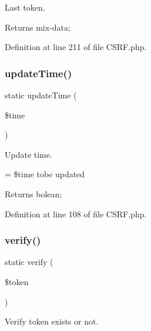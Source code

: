 Last token.

\begin{DoxyReturn}{Returns}
mix-\/data; 
\end{DoxyReturn}


Definition at line 211 of file C\+S\+R\+F.\+php.

\mbox{\label{class_zest_1_1_c_s_r_f_1_1_c_s_r_f_a32cfc547eef2579bd2b4865e13f25930}} 
\subsubsection{\texorpdfstring{update\+Time()}{updateTime()}}
{\footnotesize\ttfamily static update\+Time (\begin{DoxyParamCaption}\item[{}]{\$time }\end{DoxyParamCaption})\hspace{0.3cm}{\ttfamily [static]}}

Update time.

= \$time tobe updated

\begin{DoxyReturn}{Returns}
bolean; 
\end{DoxyReturn}


Definition at line 108 of file C\+S\+R\+F.\+php.

\mbox{\label{class_zest_1_1_c_s_r_f_1_1_c_s_r_f_ab7694821487b65d0fad9b72ed03c8139}} 
\subsubsection{\texorpdfstring{verify()}{verify()}}
{\footnotesize\ttfamily static verify (\begin{DoxyParamCaption}\item[{}]{\$token }\end{DoxyParamCaption})\hspace{0.3cm}{\ttfamily [static]}}

Verify token exists or not.

